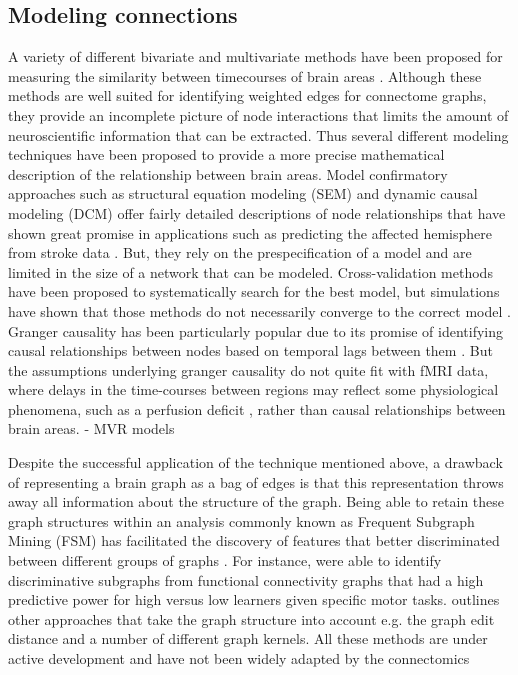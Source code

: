 \subsection{Modeling connections}

A variety of different bivariate and multivariate methods have been proposed for measuring the
similarity between timecourses of brain areas \citep{SmithNeuor2010,Varoquaux}. Although these
methods are well suited for identifying weighted edges for connectome graphs, they provide an
incomplete picture of node interactions that limits the amount of neuroscientific information
that can be extracted.  Thus several different modeling techniques have been proposed 
to provide a more precise mathematical description of the relationship between brain areas. Model
confirmatory approaches such as structural equation modeling (SEM) and dynamic causal modeling (DCM)
offer fairly detailed descriptions of node relationships that have shown great promise in applications
such as predicting the affected hemisphere from stroke data \cite{GAJames}. But, they rely on the
prespecification of a model and are limited in the size of a network that can be modeled. Cross-validation
methods have been proposed to systematically search for the best model, but simulations have shown that
those methods do not necessarily converge to the correct model \cite{lohman}. Granger causality has 
been particularly popular due to its promise of identifying causal relationships between nodes based on
temporal lags between them \cite{}. But the assumptions underlying granger causality do not quite fit with 
fMRI data, where delays in the time-courses between regions may reflect some physiological 
phenomena, such as a perfusion deficit \cite{Lv}, rather than causal relationships between brain areas. 
    - MVR models

Despite the successful application of the technique mentioned above, a drawback
of representing a brain graph as a bag of edges is that this representation
throws away all information about the structure of the graph. Being able to
retain these graph structures within an analysis commonly known as Frequent
Subgraph Mining (FSM) has facilitated the discovery of features that better
discriminated between different groups of graphs \cite{Harrison2013}. For
instance, \cite{Bogdanov2014} were able to identify discriminative subgraphs
from functional connectivity graphs that had a high predictive power for high
versus low learners given specific motor tasks. \cite{Richiardi2013} outlines
other approaches that take the graph structure into account e.g. the graph edit
distance and a number of different graph kernels. All these methods are under
active development and have not been widely adapted by the connectomics

